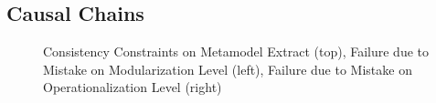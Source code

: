 



\subsection{Causal Chains}


\begin{figure}
    \centering
    
    \caption{Consistency Constraints on Metamodel Extract (top), Failure due to Mistake on Modularization Level (left), Failure due to Mistake on Operationalization Level (right)}
    \label{fig:errors:mistake_effects_example}
\end{figure}

